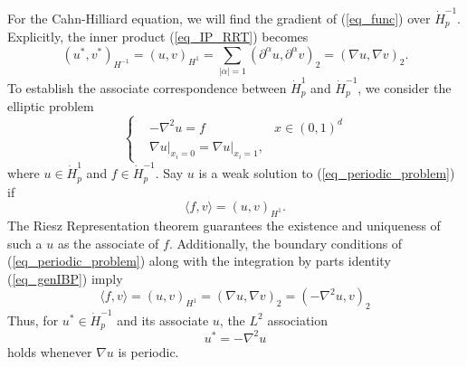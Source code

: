\documentclass[12pt, reqno]{report}
\theoremstyle{definition}
\theoremstyle{remark}
\begin{document}
For the Cahn-Hilliard equation, we will find the gradient of (\ref{eq_func}) over $\dot H^{-1}_{p}$. 
Explicitly, the inner product (\ref{eq_IP_RRT}) becomes 
\begin{equation} 
    (u^{*},v^{*})_{H^{-1}}=(u,v)_{H^{1}}=\sum_{|\alpha|=1}(\partial ^{\alpha}u,\partial ^{\alpha}v)_{2}= (\nabla u,\nabla v)_{2}.
\end{equation}
To establish the associate correspondence between $\dot H^{1}_{p}$ and $\dot H^{-1}_{p}$, we consider the elliptic problem 
\begin{equation} 
    \left\{
    \begin{split} \label{eq_periodic_problem}
        &-\nabla ^{2} u=f&x\in(0,1)^d\\
        &\nabla u\big|_{x_{i}=0}=\nabla u\big|_{x_{i}=1},
    \end{split}
    \right.
\end{equation}
where $u\in \dot H^{1}_{p}$ and $f\in\dot H^{-1}_{p}$. 
Say $u$ is a weak solution to (\ref{eq_periodic_problem}) if 
\begin{equation} 
    \langle f,v\rangle=(u,v)_{H^{1}}.
\end{equation}
The Riesz Representation theorem guarantees the existence and uniqueness of such a $u$ as the associate of $f$.
Additionally, the boundary conditions of (\ref{eq_periodic_problem}) along with the integration by parts identity (\ref{eq_genIBP}) imply
\begin{equation}
    \langle f,v\rangle=(u,v)_{H^{1}}=(\nabla u,\nabla v)_{2}=(-\nabla ^{2}u,v)_{2}
\end{equation}
Thus, for $u^{*}\in \dot H^{-1}_{p}$ and its associate $u$, the $L^{2}$ association
\begin{equation} \label{eq_association}
    u^{*}=-\nabla ^{2}u
\end{equation}
holds whenever $\nabla u$ is periodic.
\end{document}
